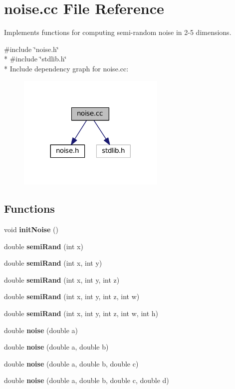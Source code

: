 \section{noise.\+cc File Reference}
\label{noise_8cc}


Implements functions for computing semi-\/random noise in 2-\/5 dimensions.  


{\ttfamily \#include \char`\"{}noise.\+h\char`\"{}}\\*
{\ttfamily \#include \char`\"{}stdlib.\+h\char`\"{}}\\*
Include dependency graph for noise.\+cc\+:
\nopagebreak
\begin{figure}[H]
\begin{center}
\leavevmode
\includegraphics[width=200pt]{noise_8cc__incl}
\end{center}
\end{figure}
\subsection*{Functions}
\begin{DoxyCompactItemize}
\item 
void {\bf init\+Noise} ()
\item 
double {\bf semi\+Rand} (int x)
\item 
double {\bf semi\+Rand} (int x, int y)
\item 
double {\bf semi\+Rand} (int x, int y, int z)
\item 
double {\bf semi\+Rand} (int x, int y, int z, int w)
\item 
double {\bf semi\+Rand} (int x, int y, int z, int w, int h)
\item 
double {\bf noise} (double a)
\item 
double {\bf noise} (double a, double b)
\item 
double {\bf noise} (double a, double b, double c)
\item 
double {\bf noise} (double a, double b, double c, double d)
\end{DoxyCompactItemize}
